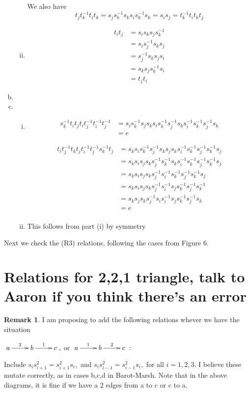\documentclass[11pt]{amsart}
\theoremstyle{definition}
\newtheorem{rem}[thm]{Remark}
\begin{document}
\begin{enumerate}[a)]
\begin{enumerate}[i)]
We also have
$$t_jt_k^{-1}t_it_k = s_js_k^{-1}s_ks_is_k^{-1}s_k = s_is_j = t_k^{-1}t_it_kt_j$$ 

\item
\begin{align*}
t_it_j &= s_is_ks_js_k^{-1}\\
&= s_is_j^{-1}s_ks_j\\
&= s_j^{-1}s_ks_js_i\\
&= s_ks_js_k^{-1}s_i\\
&= t_jt_i
\end{align*}
\end{enumerate}
\item
\item
\begin{enumerate}[i)]
\item
\begin{align*}
s_k^{-1}t_it_jt_it_j^{-1}t_i^{-1}t_j^{-1} &= s_is_k^{-1}s_js_ks_is_k^{-1}s_j^{-1}s_ks_i^{-1}s_k^{-1}s_j^{-1}s_k\\
&= e
\end{align*}

\begin{align*}
t_it_j^{-1}t_kt_jt_i^{-1}t_j^{-1}s_k^{-1}t_j &= s_ks_is_k^{-1}s_j^{-1}s_ks_js_ks_i^{-1}s_k^{-1}s_j^{-1}s_k^{-1}s_j\\
&= s_ks_is_js_ks_j^{-1}s_k^{-1}s_ks_i^{-1}s_k^{-1}s_j^{-1}s_k^{-1}s_j\\
&= s_ks_is_js_ks_j^{-1}s_i^{-1}s_k^{-1}s_j^{-1}s_k^{-1}s_j\\
&= s_ks_is_js_ks_j^{-1}s_i^{-1}s_js_k^{-1}s_j^{-1}s_k^{-1}\\
&= s_ks_js_ks_j^{-1}s_is_i^{-1}s_js_k^{-1}s_j^{-1}s_k\\
&= e\\
\end{align*}

\item This follows from part (i) by symmetry
\end{enumerate}
\end{enumerate}


Next we check the (R3) relations, following the cases from Figure 6.


\section{Relations for 2,2,1 triangle, talk to Aaron if you think there's an error}

\begin{rem}
\label{even_more_relations}
I am proposing to add the following relations whever we have the situation

$\xymatrix{a \ar[r]^2 & b \ar[r]^1 & c},$ or $\xymatrix{a \ar[r]^1 & b \ar[r]^2 & c}:$

Include $s_is_{i+1}^2 = s_{i+1}^2s_i,$ and $s_is_{i-1}^2 = s_{i-1}^2s_i,$ for all $i = 1,2,3.$ I believe these mutate correctly, as in cases b,c,d in Barot-Marsh. Note that in the above diagrams, it is fine if we have a 2 edges from a to c or c to a.
\end{rem}
\end{document}
